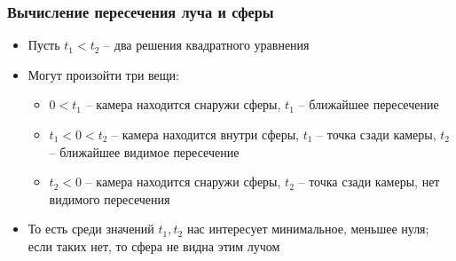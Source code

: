 \documentclass[10pt]{beamer}
\begin{document}
\begin{frame}
\frametitle{Вычисление пересечения луча и сферы}
\begin{itemize}
\item Пусть \begin{math}t_1 < t_2\end{math} -- два решения квадратного уравнения
\pause
\item Могут произойти три вещи:
\pause
\begin{itemize}
\item \begin{math}0 < t_1\end{math} -- камера находится снаружи сферы, \begin{math}t_1\end{math} -- ближайшее пересечение
\pause
\item \begin{math}t_1 < 0 < t_2\end{math} -- камера находится внутри сферы, \begin{math}t_1\end{math} -- точка сзади камеры, \begin{math}t_2\end{math} -- ближайшее видимое пересечение
\pause
\item \begin{math}t_2 < 0\end{math} -- камера находится снаружи сферы, \begin{math}t_2\end{math} -- точка сзади камеры, нет видимого пересечения
\end{itemize}
\pause
\item То есть среди значений \begin{math}t_1, t_2\end{math} нас интересует минимальное, меньшее нуля; если таких нет, то сфера не видна этим лучом
\end{itemize}
\end{frame}
\end{document}
